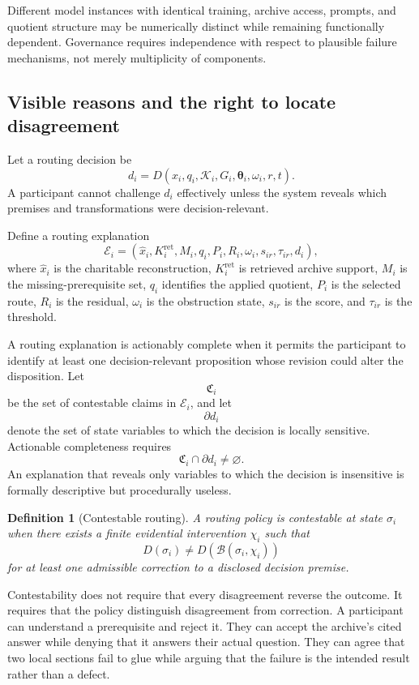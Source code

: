 \documentclass[11pt]{article}
\newtheorem{definition}{Definition}[section]
\theoremstyle{definition}
\newcommand{\K}{\mathcal{K}}
\newcommand{\thetaState}{\boldsymbol{\theta}}
\begin{document}
Different model instances with identical training, archive access, prompts, and quotient structure may be numerically distinct while remaining functionally dependent. Governance requires independence with respect to plausible failure mechanisms, not merely multiplicity of components.

\subsection{Visible reasons and the right to locate disagreement}

Let a routing decision be
\[
d_i
=
D\!\left(
x_i,
q_i,
\K_i,
G_i,
\thetaState_i,
\omega_i,
r,
t
\right).
\]
A participant cannot challenge \(d_i\) effectively unless the system reveals which premises and transformations were decision-relevant.

Define a routing explanation
\[
\mathcal{E}_i
=
\left(
\widehat x_i,
K_i^{\mathrm{ret}},
M_i,
q_i,
P_i,
R_i,
\omega_i,
s_{ir},
\tau_{ir},
d_i
\right),
\]
where \(\widehat x_i\) is the charitable reconstruction, \(K_i^{\mathrm{ret}}\) is retrieved archive support, \(M_i\) is the missing-prerequisite set, \(q_i\) identifies the applied quotient, \(P_i\) is the selected route, \(R_i\) is the residual, \(\omega_i\) is the obstruction state, \(s_{ir}\) is the score, and \(\tau_{ir}\) is the threshold.

A routing explanation is actionably complete when it permits the participant to identify at least one decision-relevant proposition whose revision could alter the disposition. Let
\[
\mathfrak{C}_i
\]
be the set of contestable claims in \(\mathcal{E}_i\), and let
\[
\partial d_i
\]
denote the set of state variables to which the decision is locally sensitive. Actionable completeness requires
\[
\mathfrak{C}_i\cap\partial d_i\neq\varnothing.
\]
An explanation that reveals only variables to which the decision is insensitive is formally descriptive but procedurally useless.

\begin{definition}[Contestable routing]
A routing policy is contestable at state \(\sigma_i\) when there exists a finite evidential intervention \(\chi_i\) such that
\[
D(\sigma_i)\neq
D\!\left(
\mathcal{B}(\sigma_i,\chi_i)
\right)
\]
for at least one admissible correction to a disclosed decision premise.
\end{definition}

Contestability does not require that every disagreement reverse the outcome. It requires that the policy distinguish disagreement from correction. A participant can understand a prerequisite and reject it. They can accept the archive's cited answer while denying that it answers their actual question. They can agree that two local sections fail to glue while arguing that the failure is the intended result rather than a defect.
\end{document}
